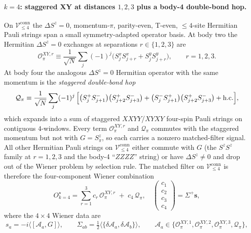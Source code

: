 \documentclass[11pt,a4paper]{article}
\newcommand{\Vconn}[1]{\mathcal{V}^{\mathrm{conn}}_{\le #1}}
\providecommand{\anticomm}[2]{\{#1,#2\}}\renewcommand{\anticomm}[2]{\{#1,#2\}}
\begin{document}
\paragraph{$k=4$: staggered XY at distances $1,2,3$ plus a body-4
double-bond hop.}
On $\Vconn{4}$ the $\Delta S^z=0$, momentum-$\pi$, parity-even,
T-even, $\le 4$-site Hermitian Pauli strings span a small
symmetry-adapted operator basis.  At body two the Hermitian
$\Delta S^z=0$ exchanges at separations $r\in\{1,2,3\}$ are
\begin{equation}
   \mathcal O^{XY,r}_\pi
   \equiv\frac{1}{\sqrt N}\sum_{j}(-1)^j
   \bigl(S^x_jS^x_{j+r}+S^y_jS^y_{j+r}\bigr),
   \qquad r=1,2,3.
   \label{eq:OXYr}
\end{equation}
At body four the analogous $\Delta S^z=0$ Hermitian operator with
the same momentum is the \emph{staggered double-bond hop}
\begin{equation}
   \mathcal Q_\pi\equiv\frac{1}{\sqrt N}\sum_j(-1)^j\,
   \Bigl[\bigl(S^+_jS^-_{j+1}\bigr)\bigl(S^+_{j+2}S^-_{j+3}\bigr)
        +\bigl(S^-_jS^+_{j+1}\bigr)\bigl(S^+_{j+2}S^-_{j+3}\bigr)
        +\text{h.c.}\Bigr],
   \label{eq:Qpi}
\end{equation}
which expands into a sum of staggered $XXYY$/$XYXY$ four-spin
Pauli strings on contiguous $4$-windows.  Every term
$\mathcal O^{XY,r}_\pi$ and $\mathcal Q_\pi$ commutes with the
staggered momentum but not with $G=S^z_\pi$, so each carries a
nonzero matched-filter signal.  All other Hermitian Pauli strings
on $\Vconn{4}$ either commute with $G$ (the $S^zS^z$ family at
$r=1,2,3$ and the body-4 ``$ZZZZ$'' string) or have
$\Delta S^z\ne 0$ and drop out of the Wiener problem by selection
rule.  The matched filter on $\Vconn{4}$ is therefore the
four-component Wiener combination
\begin{equation}
   \boxed{\;O^\star_{k=4}
   =\sum_{r=1}^{3}c_r\,\mathcal O^{XY,r}_\pi
   \;+\;c_4\,\mathcal Q_\pi,\quad
   \begin{pmatrix}c_1\\ c_2\\ c_3\\ c_4\end{pmatrix}
   =\Sigma^+\mathbf s,\;}
   \label{eq:Ostar4_main}
\end{equation}
where the $4\times 4$ Wiener data are
\begin{equation}
   s_a=-i\langle[\mathcal A_a,G]\rangle,\qquad
   \Sigma_{ab}=\tfrac12\bigl\langle\anticomm{\delta\mathcal A_a}{\delta\mathcal A_b}\bigr\rangle,
   \qquad
   \mathcal A_a\in\bigl\{\mathcal O^{XY,1}_\pi,\mathcal O^{XY,2}_\pi,
        \mathcal O^{XY,3}_\pi,\mathcal Q_\pi\bigr\},
\end{equation}
\end{document}
